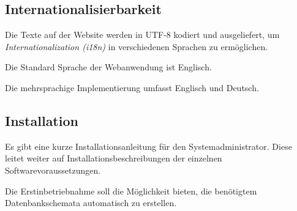 \subsection{Internationalisierbarkeit}

\begin{description}
	 Die Texte auf der Website werden in UTF-8 kodiert
	und ausgeliefert, um \textit{Internationalization (i18n)} in verschiedenen Sprachen zu ermöglichen.

	 Die Standard Sprache der Webanwendung ist Englisch.

	 Die mehrsprachige Implementierung umfasst Englisch und Deutsch.
 \end{description}

\subsection{Installation}

\begin{description}
	 Es gibt eine kurze Installationsanleitung für den Systemadministrator. Diese leitet weiter auf Installationsbeschreibungen der einzelnen Softwarevoraussetzungen.

	 Die Erstinbetriebnahme soll die Möglichkeit bieten, die benötigtem Datenbankschemata automatisch zu erstellen.
\end{description}
